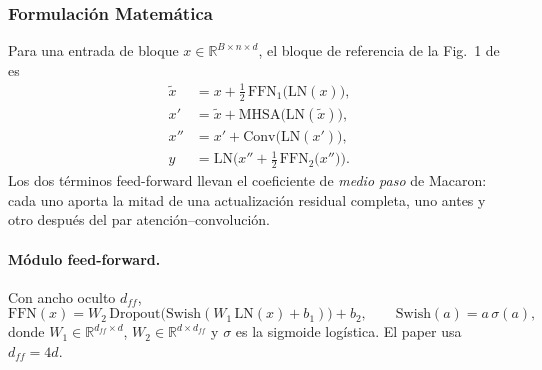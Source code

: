 \subsubsection{Formulación Matemática}

Para una entrada de bloque $x \in \mathbb{R}^{B \times n \times d}$, el bloque de referencia de la Fig.~1 de \citet{Gulati2020} es
\begin{align}
\tilde{x} &= x + \tfrac{1}{2}\,\mathrm{FFN}_1\big(\mathrm{LN}(x)\big), \label{eq:conformer-ffn1}\\
x' &= \tilde{x} + \mathrm{MHSA}\big(\mathrm{LN}(\tilde{x})\big), \label{eq:conformer-mhsa}\\
x'' &= x' + \mathrm{Conv}\big(\mathrm{LN}(x')\big), \label{eq:conformer-conv}\\
y &= \mathrm{LN}\Big(x'' + \tfrac{1}{2}\,\mathrm{FFN}_2\big(x''\big)\Big). \label{eq:conformer-ffn2}
\end{align}
Los dos términos feed-forward llevan el coeficiente de \emph{medio paso} de Macaron: cada uno aporta la mitad de una actualización residual completa, uno antes y otro después del par atención--convolución.

\paragraph{Módulo feed-forward.} Con ancho oculto $d_{ff}$,
\begin{equation}
\mathrm{FFN}(x) = W_2\,\mathrm{Dropout}\big(\mathrm{Swish}(W_1\,\mathrm{LN}(x) + b_1)\big) + b_2,
\qquad
\mathrm{Swish}(a) = a\,\sigma(a),
\label{eq:conformer-ffn}
\end{equation}
donde $W_1 \in \mathbb{R}^{d_{ff} \times d}$, $W_2 \in \mathbb{R}^{d \times d_{ff}}$ y $\sigma$ es la sigmoide logística. El paper usa $d_{ff} = 4d$.

